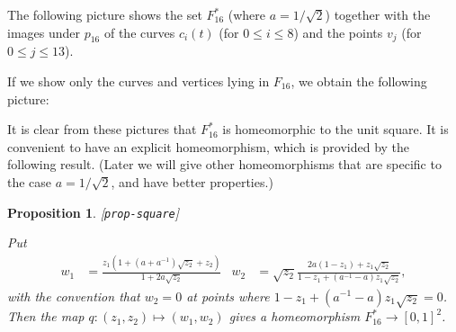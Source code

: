 \documentclass[reqno]{amsart}
\newcommand{\lbl}[1]{\label{#1}\textup{[\texttt{#1}]}\par}
\newcommand{\lbl}{\label}
\newcommand{\rt}        {\sqrt{2}}
\renewcommand{\:}{\colon}
\newtheorem{proposition}[theorem]{Proposition}
\theoremstyle{definition}
\begin{document}
The following picture shows the set $F_{16}^*$ (where $a=1/\rt$)
together with the images under $p_{16}$ of the curves $c_i(t)$ (for
$0\leq i\leq 8$) and the points $v_j$ (for $0\leq j\leq 13$).


If we show only the curves and vertices lying in $F_{16}$, we obtain the
following picture:


It is clear from these pictures that $F_{16}^*$ is homeomorphic to the
unit square.  It is convenient to have an explicit homeomorphism,
which is provided by the following result.  (Later we will give other
homeomorphisms that are specific to the case $a=1/\rt$, and have
better properties.)

\begin{proposition}\lbl{prop-square}
 Put
 \begin{align*}
  w_1 &= \frac{z_1(1+(a+a^{-1})\sqrt{z_2}+z_2)}{1+2a\sqrt{z_2}} &
  w_2 &=
   \sqrt{z_2}\frac{2a(1-z_1)+z_1\sqrt{z_2}}{1-z_1+(a^{-1}-a)z_1\sqrt{z_2}},
 \end{align*}
 with the convention that $w_2=0$ at points where
 $1-z_1+(a^{-1}-a)z_1\sqrt{z_2}=0$.  Then the map
 $q\:(z_1,z_2)\mapsto(w_1,w_2)$ gives a homeomorphism $F_{16}^*\to[0,1]^2$.
\end{proposition}
\end{document}
